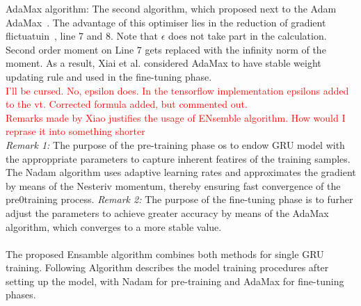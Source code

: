 AdaMax algorithm:
The second algorithm, which proposed next to the Adam AdaMax~\cite{kingma_adam_2017}.
The advantage of this optimiser lies in the reduction of gradient flictuatuin~\cite{xiao_accurate_2019}, line 7 and 8.
Note that $\epsilon$ does not take part in the calculation.
Second order moment on Line 7 gets replaced with the infinity norm of the moment.
As a result, Xiai et al. considered AdaMax to have stable weight updating rule and used in the fine-tuning phase.
\\
\textcolor{red}{I'll be cursed. No, epsilon does. In the tensorflow implementation epsilons added to the vt. Corrected formula added, but commented out. \\
Remarks made by Xiao justifies the usage of ENsemble algorithm. How would I reprase it into something shorter}\\
\textit{Remark 1:} The purpose of the pre-training phase os to endow GRU model with the approppriate parameters to capture inherent featires of the training samples. The Nadam algorithm uses adaptive learning rates and approximates the gradient by means of the Nesteriv momentum, thereby ensuring fast convergence of the pre0training process.
\textit{Remark 2:} The purpose of the fine-tuning phase is to furher adjust the parameters to achieve greater accuracy by means of the AdaMax algorithm, which converges to a more stable value. \\ \\
The proposed Ensamble algorithm combines both methods for single GRU training.
Following Algorithm describes the model training procedures after setting up the model, with Nadam for pre-training and AdaMax for fine-tuning phases.
